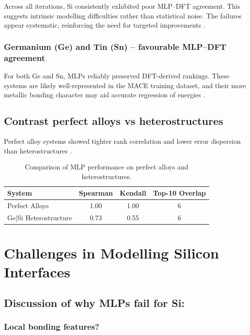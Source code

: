 Across all iterations, Si consistently exhibited poor MLP--DFT agreement. This suggests intrinsic modelling difficulties rather than statistical noise. The failures appear systematic, reinforcing the need for targeted improvements .

\subsubsection{Germanium (Ge) and Tin (Sn) – favourable MLP--DFT agreement}

For both Ge and Sn, MLPs reliably preserved DFT-derived rankings. These systems are likely well-represented in the MACE training dataset, and their more metallic bonding character may aid accurate regression of energies .

\subsection{Contrast perfect alloys vs heterostructures}

Perfect alloy systems showed tighter rank correlation and lower error dispersion than heterostructures .

\begin{table}[h]
    \centering
    \caption{Comparison of MLP performance on perfect alloys and heterostructures.}
    \begin{tabular}{lccc}
        System & Spearman & Kendall & Top-10 Overlap \\
        \hline
        Perfect Alloys & 1.00 & 1.00 & 6 \\
        Ge|Si Heterostructure & 0.73 & 0.55 & 6 \\
    \end{tabular}
\end{table}

\section{Challenges in Modelling Silicon Interfaces} \label{section:challenges_in_modelling_silicon_interfaces}

\subsection{Discussion of why MLPs fail for Si:}

\subsubsection{Local bonding features?}

